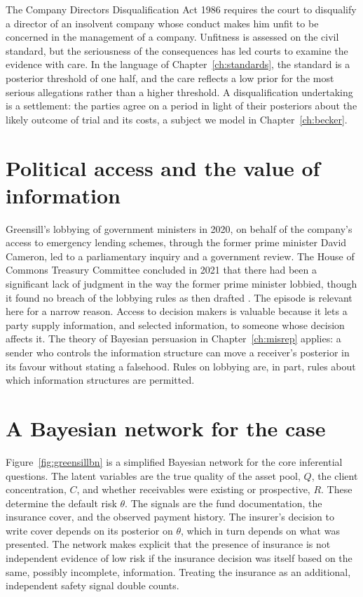 The Company Directors Disqualification Act 1986 requires the court to disqualify a director of an insolvent company whose conduct makes him unfit to be concerned in the management of a company. Unfitness is assessed on the civil standard, but the seriousness of the consequences has led courts to examine the evidence with care. In the language of Chapter~\ref{ch:standards}, the standard is a posterior threshold of one half, and the care reflects a low prior for the most serious allegations rather than a higher threshold. A disqualification undertaking is a settlement: the parties agree on a period in light of their posteriors about the likely outcome of trial and its costs, a subject we model in Chapter~\ref{ch:becker}.

\section{Political access and the value of information}

Greensill's lobbying of government ministers in 2020, on behalf of the company's access to emergency lending schemes, through the former prime minister David Cameron, led to a parliamentary inquiry and a government review. The House of Commons Treasury Committee concluded in 2021 that there had been a significant lack of judgment in the way the former prime minister lobbied, though it found no breach of the lobbying rules as then drafted \citep{treasury2021}. The episode is relevant here for a narrow reason. Access to decision makers is valuable because it lets a party supply information, and selected information, to someone whose decision affects it. The theory of Bayesian persuasion in Chapter~\ref{ch:misrep} applies: a sender who controls the information structure can move a receiver's posterior in its favour without stating a falsehood. Rules on lobbying are, in part, rules about which information structures are permitted.

\section{A Bayesian network for the case}

Figure~\ref{fig:greensillbn} is a simplified Bayesian network for the core inferential questions. The latent variables are the true quality of the asset pool, $Q$, the client concentration, $C$, and whether receivables were existing or prospective, $R$. These determine the default risk $\theta$. The signals are the fund documentation, the insurance cover, and the observed payment history. The insurer's decision to write cover depends on its posterior on $\theta$, which in turn depends on what was presented. The network makes explicit that the presence of insurance is not independent evidence of low risk if the insurance decision was itself based on the same, possibly incomplete, information. Treating the insurance as an additional, independent safety signal double counts.

